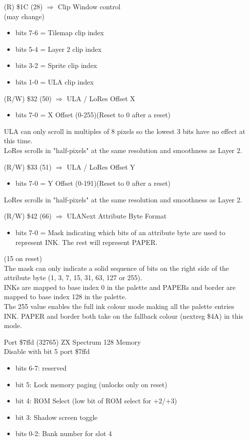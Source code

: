 (R) \$1C (28) $\Rightarrow$ Clip Window control\\
(may change)
\begin{itemize}
\item[] bits 7-6 = Tilemap clip index
\item[] bits 5-4 = Layer 2 clip index
\item[] bits 3-2 = Sprite clip index
\item[] bits 1-0 = ULA clip index
\end{itemize}

(R/W) \$32 (50) $\Rightarrow$ ULA / LoRes Offset X
\begin{itemize}
\item[] bits 7-0 = X Offset (0-255)(Reset to 0 after a reset)
\end{itemize}
ULA can only scroll in multiples of 8 pixels so the lowest 3 bits have
no effect at this time.\\
LoRes scrolls in "half-pixels" at the same resolution and smoothness
as Layer 2.

(R/W) \$33 (51) $\Rightarrow$ ULA / LoRes Offset Y
\begin{itemize}
\item[] bits 7-0 = Y Offset (0-191)(Reset to 0 after a reset)
\end{itemize}
LoRes scrolls in "half-pixels" at the same resolution and smoothness
as Layer 2.

(R/W) \$42 (66) $\Rightarrow$ ULANext Attribute Byte Format
\begin{itemize}
\item[] bits 7-0 = Mask indicating which bits of an attribute byte are
  used to represent INK. The rest will represent PAPER.
\end{itemize}
(15 on reset)\\
The mask can only indicate a solid sequence of bits on the right side
of the attribute byte (1, 3, 7, 15, 31, 63, 127 or 255).\\
INKs are mapped to base index 0 in the palette and PAPERs and border
are mapped to base index 128 in the palette.\\
The 255 value enables the full ink colour mode making all the palette
entries INK. PAPER and border both take on the fallback colour
(nextreg \$4A) in this mode.

Port \$7ffd (32765) ZX Spectrum 128 Memory\\
Disable with bit 5 port \$7ffd
\begin{itemize}
\item[] bits 6-7: reserved
\item[] bit 5: Lock memory paging (unlocks only on reset)
\item[] bit 4: ROM Select (low bit of ROM select for +2/+3)
\item[] bit 3: Shadow screen toggle
\item[] bits 0-2: Bank number for slot 4
\end{itemize}

